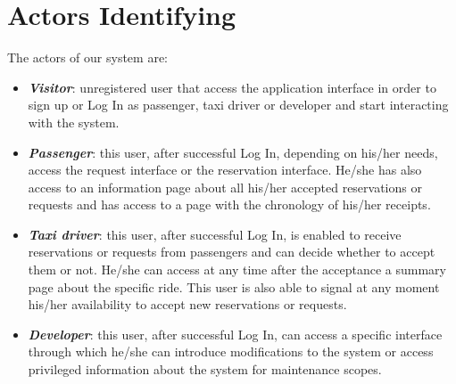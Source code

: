 \chapter{Actors Identifying} \label{chap2}

The actors of our system are:
\begin{itemize}
	\item \textbf{\textit{Visitor}}: unregistered user that access the application interface in order to sign up or Log In as passenger, taxi driver or developer and start interacting with the system.
	\item \textbf{\textit{Passenger}}: this user, after successful Log In, depending on his/her needs, access the request interface or the reservation interface. He/she has also access to an information page about all his/her accepted reservations or requests and has access to a page with the chronology of his/her receipts.
	\item \textbf{\textit{Taxi driver}}: this user, after successful Log In, is enabled to receive reservations or requests from passengers and can decide whether to accept them or not. He/she can access at any time after the acceptance a summary page about the specific ride. This user is also able to signal at any moment his/her availability to accept new reservations or requests.
	\item \textbf{\textit{Developer}}: this user, after successful Log In, can access a specific interface through which he/she can introduce modifications to the system or access privileged information about the system for maintenance scopes.
\end{itemize}